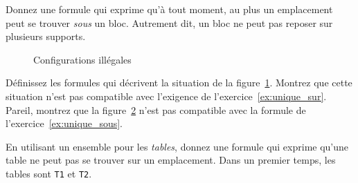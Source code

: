 \begin{exo}\label{ex:unique_sous}
Donnez une formule qui exprime qu'à tout moment, au plus un emplacement peut se
  trouver \emph{sous} un bloc. Autrement dit, un bloc ne peut pas reposer sur
  plusieurs supports.
\end{exo}
\begin{figure}[h]
\begin{subfigure}[b]{0.5\textwidth}
\centering
{}
\caption{}\label{fig:unique_sur}
\end{subfigure}%
%
\begin{subfigure}[b]{0.5\textwidth}
\centering
{}
\caption{}\label{fig:unique_sous}
\end{subfigure}%
%
\caption{Configurations illégales}\label{fig:config_illeg}
\end{figure}

\begin{exo}\label{ex:unique_sur_sous_ex} 
Définissez les formules qui décrivent la situation de la
  figure~\ref{fig:unique_sur}. Montrez que cette situation n'est pas
  compatible avec l'exigence de l'exercice~\ref{ex:unique_sur}. Pareil,
  montrez que la figure~\ref{fig:unique_sous} n'est pas compatible avec la
  formule de l'exercice~\ref{ex:unique_sous}.
\end{exo}

\begin{exo}\label{ex:tables}En utilisant un ensemble pour les \emph{tables}, donnez une formule qui exprime qu'une table ne peut pas se trouver sur un  emplacement. Dans un premier temps, les tables sont \texttt{T1} et \texttt{T2}.
\end{exo}


